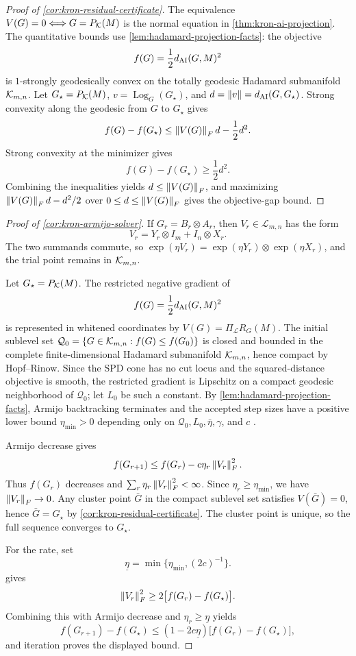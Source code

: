 \begin{proof}[Proof of \cref{cor:kron-residual-certificate}]
The equivalence \(V(G)=0\Longleftrightarrow G=P_{\mathcal K}(M)\) is the normal
equation in \cref{thm:kron-ai-projection}. The quantitative bounds use
\cref{lem:hadamard-projection-facts}: the objective
\[
  f(G)=\frac12d_{\mathrm{AI}}(G,M)^2
\]
is \(1\)-strongly geodesically convex on the totally geodesic Hadamard
submanifold \(\mathcal K_{m,n}\). Let \(G_\star=P_{\mathcal K}(M)\),
\(v=\operatorname{Log}_G(G_\star)\), and
\(d=\left\lVert v\right\rVert=d_{\mathrm{AI}}(G,G_\star)\). Strong convexity along the geodesic from
\(G\) to \(G_\star\) gives
\[
  f(G)-f(G_\star)\le \left\lVert V(G)\right\rVert_Fd-\frac12d^2.
\]
Strong convexity at the minimizer gives
\[
  f(G)-f(G_\star)\ge\frac12d^2.
\]
Combining the inequalities yields \(d\le\left\lVert V(G)\right\rVert_F\), and maximizing
\(\left\lVert V(G)\right\rVert_Fd-d^2/2\) over \(0\le d\le\left\lVert V(G)\right\rVert_F\) gives the objective-gap
bound.
\end{proof}

\begin{proof}[Proof of \cref{cor:kron-armijo-solver}]
If \(G_r=B_r\otimes A_r\), then \(V_r\in\mathcal L_{m,n}\) has the form
\[
  V_r=Y_r\otimes I_m+I_n\otimes X_r.
\]
The two summands commute, so \(\exp(\eta V_r)=\exp(\eta Y_r)\otimes
\exp(\eta X_r)\), and the trial point remains in \(\mathcal K_{m,n}\).

Let \(G_\star=P_{\mathcal K}(M)\). The restricted negative gradient of
\[
  f(G)=\frac12d_{\mathrm{AI}}(G,M)^2
\]
is represented in whitened coordinates by
\(V(G)=\Pi_{\mathcal L}R_G(M)\). The initial sublevel set
\(\mathcal Q_0=\{G\in\mathcal K_{m,n}:f(G)\le f(G_0)\}\) is closed and bounded in
the complete finite-dimensional Hadamard submanifold \(\mathcal K_{m,n}\), hence
compact by Hopf--Rinow. Since the SPD cone has no cut locus and the
squared-distance objective is smooth, the restricted gradient is Lipschitz on
a compact geodesic neighborhood of \(\mathcal Q_0\); let \(L_0\) be such a
constant. By \cref{lem:hadamard-projection-facts}, Armijo backtracking
terminates and the accepted step sizes have a positive lower bound
\(\eta_{\min}>0\) depending only on
\(\mathcal Q_0,L_0,\bar\eta,\gamma\), and \(c\)
\cite{absil2008optimization,boumal2023introduction}.

Armijo decrease gives
\[
  f(G_{r+1})\le f(G_r)-c\eta_r\left\lVert V_r\right\rVert_F^2.
\]
Thus \(f(G_r)\) decreases and \(\sum_r\eta_r\left\lVert V_r\right\rVert_F^2<\infty\). Since
\(\eta_r\ge\eta_{\min}\), we have \(\left\lVert V_r\right\rVert_F\to0\). Any cluster point
\(\bar G\) in the compact sublevel set satisfies \(V(\bar G)=0\), hence
\(\bar G=G_\star\) by \cref{cor:kron-residual-certificate}. The cluster point is
unique, so the full sequence converges to \(G_\star\).

For the rate, set
\[
  \underline\eta=\min\{\eta_{\min},(2c)^{-1}\}.
\]
 gives
\[
  \left\lVert V_r\right\rVert_F^2\ge2\bigl[f(G_r)-f(G_\star)\bigr].
\]
Combining this with Armijo decrease and \(\eta_r\ge\underline\eta\) yields
\[
  f(G_{r+1})-f(G_\star)
  \le
  (1-2c\underline\eta)\bigl[f(G_r)-f(G_\star)\bigr],
\]
and iteration proves the displayed bound.
\end{proof}

